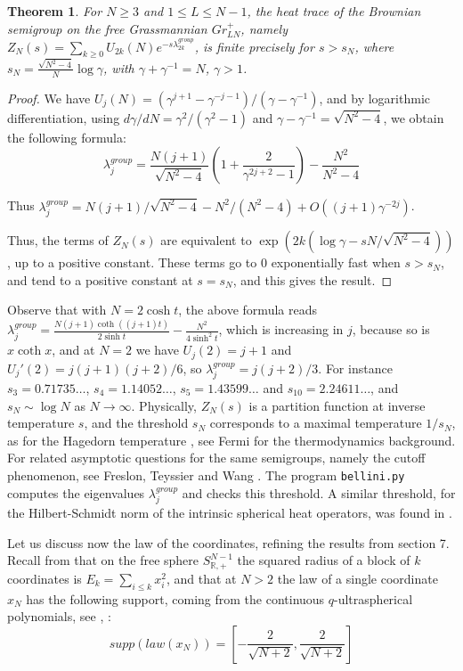\documentclass[11pt]{article}
\theoremstyle{plain}
\newtheorem{theorem}{Theorem}[section]
\begin{document}
\begin{theorem}
\label{thm:heattrace}
For $N\geq3$ and $1\leq L\leq N-1$, the heat trace of the Brownian semigroup on the free Grassmannian $Gr^+_{LN}$, namely $Z_N(s)=\sum_{k\geq0}U_{2k}(N)e^{-s\lambda_{2k}^{group}}$, is finite precisely for $s>s_N$, where $s_N=\frac{\sqrt{N^2-4}}{N}\log\gamma$, with $\gamma+\gamma^{-1}=N$, $\gamma>1$.
\end{theorem}

\begin{proof}
We have $U_j(N)=(\gamma^{j+1}-\gamma^{-j-1})/(\gamma-\gamma^{-1})$, and by logarithmic differentiation, using $d\gamma/dN=\gamma^2/(\gamma^2-1)$ and $\gamma-\gamma^{-1}=\sqrt{N^2-4}$, we obtain the following formula:
$$\lambda_j^{group}=\frac{N(j+1)}{\sqrt{N^2-4}}\left(1+\frac{2}{\gamma^{2j+2}-1}\right)-\frac{N^2}{N^2-4}$$

Thus $\lambda_j^{group}=N(j+1)/\sqrt{N^2-4}-N^2/(N^2-4)+O((j+1)\gamma^{-2j})$.

Thus, the terms of $Z_N(s)$ are equivalent to $\exp(2k(\log\gamma-sN/\sqrt{N^2-4}))$, up to a positive constant. These terms go to 0 exponentially fast when $s>s_N$, and tend to a positive constant at $s=s_N$, and this gives the result.
\end{proof}

Observe that with $N=2\cosh t$, the above formula reads $\lambda_j^{group}=\frac{N(j+1)\coth((j+1)t)}{2\sinh t}-\frac{N^2}{4\sinh^2t}$, which is increasing in $j$, because so is $x\coth x$, and at $N=2$ we have $U_j(2)=j+1$ and $U_j'(2)=j(j+1)(j+2)/6$, so $\lambda_j^{group}=j(j+2)/3$. For instance $s_3=0.71735\ldots$, $s_4=1.14052\ldots$, $s_5=1.43599\ldots$ and $s_{10}=2.24611\ldots$, and $s_N\sim\log N$ as $N\to\infty$. Physically, $Z_N(s)$ is a partition function at inverse temperature $s$, and the threshold $s_N$ corresponds to a maximal temperature $1/s_N$, as for the Hagedorn temperature \cite{hag}, see Fermi \cite{fth} for the thermodynamics background. For related asymptotic questions for the same semigroups, namely the cutoff phenomenon, see Freslon, Teyssier and Wang \cite{ftw}. The program {\tt bellini.py} computes the eigenvalues $\lambda_j^{group}$ and checks this threshold. A similar threshold, for the Hilbert-Schmidt norm of the intrinsic spherical heat operators, was found in \cite{mfs}.

\bigskip

Let us discuss now the law of the coordinates, refining the results from section 7. Recall from \cite{mfs} that on the free sphere $S^{N-1}_{\mathbb R,+}$ the squared radius of a block of $k$ coordinates is $E_k=\sum_{i\leq k}x_i^2$, and that at $N>2$ the law of a single coordinate $x_N$ has the following support, coming from the continuous $q$-ultraspherical polynomials, see \cite{bcz}, \cite{mfs}:
$$supp(law(x_N))=\left[-\frac{2}{\sqrt{N+2}},\frac{2}{\sqrt{N+2}}\right]$$
\end{document}
